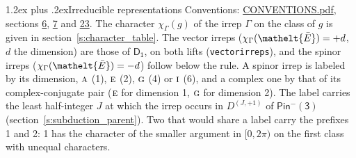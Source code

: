 \documentclass[10pt,a4paper]{article}
\makeatletter
\renewcommand\section{\@startsection{section}{1}{\z@}{-3ex plus -1ex minus -.2ex}%
  {1.2ex plus .2ex}{\normalfont\large\sffamily\bfseries\color{parttitle}}}
\numberwithin{equation}{section}
\newcommand{\eltfont}[1]{{\let\sigma\eltsigma\mathelt{#1}}}
\newcommand{\grp}[1]{\mathsf{#1}}
\newcommand{\irr}[1]{\text{\normalfont\scshape #1}}
\newcommand{\elt}[1]{\eltfont{#1}}
\newcommand{\irrJp}[2]{D^{(#1,#2)}}
\newcommand{\irchar}[1]{\chi_{#1}}
\newcommand{\barred}[1]{\bar{#1}}
\makeatother
\begin{document}
\section{Irreducible representations}\label{s:irreps}
Conventions: \href{../../CONVENTIONS.pdf}{CONVENTIONS.pdf}, sections \href{../../../rotation/CONVENTIONS.pdf\#conv.6}{6}, \href{../../../rotation/CONVENTIONS.pdf\#conv.7}{7} and \href{../../CONVENTIONS.pdf\#conv.23}{23}.
\leavevmode\label{n:function.character}\label{n:irrep.Gamma}The character $\irchar{\Gamma}(g)$ of the irrep $\Gamma$ on the class of $g$ is given in section~\ref{s:character_table}. \label{n:index.dimension}The vector irreps ($\irchar{\Gamma}(\elt{\barred{E}}) = +d$, $d$ the dimension) are those of \href{../../../rotation/data/pdf/D1.pdf}{$\grp{D_{1}}$}, on both lifts (\texttt{vectorirreps}), and the spinor irreps ($\irchar{\Gamma}(\elt{\barred{E}}) = -d$) follow below the rule. A spinor irrep is labeled by its dimension, $\irr{a}$ (1), $\irr{e}$ (2), $\irr{g}$ (4) or $\irr{i}$ (6), and a complex one by that of its complex-conjugate pair ($\irr{e}$ for dimension 1, $\irr{g}$ for dimension 2). The label carries the least half-integer $J$ at which the irrep occurs in $\irrJp{J}{+1}$ of $\grp{Pin^{-}(3)}$ (section~\ref{s:subduction_parent}). Two that would share a label carry the prefixes 1 and 2: 1 has the character of the smaller argument in $[0, 2\pi)$ on the first class with unequal characters.
\end{document}
